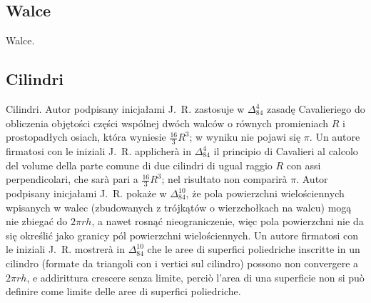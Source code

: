 
\subsection{Walce} %
Walce. %
\subsection{Cilindri} %
Cilindri. %
Autor podpisany inicjałami J.~R. zastosuje w $\Delta_{84}^{4}$ zasadę Cavalieriego do obliczenia objętości części wspólnej dwóch walców o równych promieniach $R$ i prostopadłych osiach, która wyniesie $\frac{16}{3} R^3$; w wyniku nie pojawi się $\pi$. %
Un autore firmatosi con le iniziali J.~R. applicherà in $\Delta_{84}^{4}$ il principio di Cavalieri al calcolo del volume della parte comune di due cilindri di ugual raggio $R$ con assi perpendicolari, che sarà pari a $\frac{16}{3} R^3$; nel risultato non comparirà $\pi$. %
Autor podpisany inicjałami J.~R. pokaże w $\Delta_{84}^{10}$, że pola powierzchni wielościennych wpisanych w walec (zbudowanych z trójkątów o wierzchołkach na walcu) mogą nie zbiegać do $2 \pi r h$, a nawet rosnąć nieograniczenie, więc pola powierzchni nie da się określić jako granicy pól powierzchni wielościennych. %
Un autore firmatosi con le iniziali J.~R. mostrerà in $\Delta_{84}^{10}$ che le aree di superfici poliedriche inscritte in un cilindro (formate da triangoli con i vertici sul cilindro) possono non convergere a $2 \pi r h$, e addirittura crescere senza limite, perciò l'area di una superficie non si può definire come limite delle aree di superfici poliedriche. %
